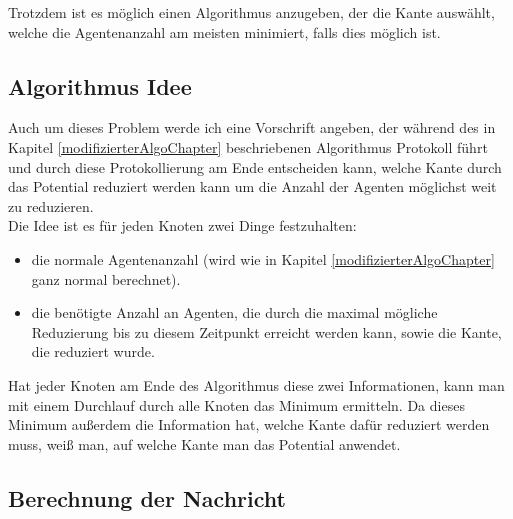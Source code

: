 Trotzdem ist es möglich einen Algorithmus anzugeben, der die Kante auswählt, welche die Agentenanzahl am meisten minimiert, falls dies möglich ist.


\subsection*{Algorithmus Idee}

	Auch um dieses Problem werde ich eine Vorschrift angeben, der während des in Kapitel \ref{modifizierterAlgoChapter} beschriebenen Algorithmus Protokoll führt und durch diese Protokollierung am Ende entscheiden kann, welche Kante durch das Potential reduziert werden kann um die Anzahl der Agenten möglichst weit zu reduzieren.\\
	Die Idee ist es für jeden Knoten zwei Dinge festzuhalten: 
	\begin{itemize}
		\item die normale Agentenanzahl (wird wie in Kapitel \ref{modifizierterAlgoChapter} ganz normal berechnet).
		\item die benötigte Anzahl an  Agenten, die durch die maximal mögliche Reduzierung bis zu diesem Zeitpunkt erreicht werden kann, sowie die Kante, die reduziert wurde.
	\end{itemize}
	Hat jeder Knoten am Ende des Algorithmus diese zwei Informationen, kann man mit einem Durchlauf durch alle Knoten das Minimum ermitteln. Da dieses Minimum außerdem die Information hat, welche Kante dafür reduziert werden muss, weiß man, auf welche Kante man das Potential anwendet.
	
	\subsection*{Berechnung der Nachricht}
	
